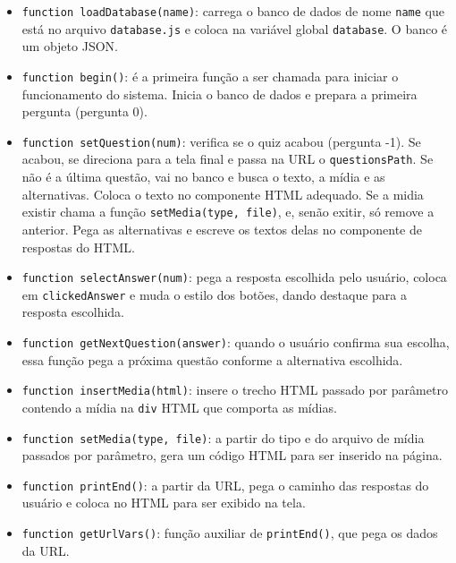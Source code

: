 \documentclass{article}
\begin{document}
\begin{itemize}

\item \texttt{function loadDatabase(name)}: carrega o banco de dados de nome \texttt{name} que está no arquivo \texttt{database.js} e coloca na variável global \texttt{database}. O banco é um objeto JSON.

\item \texttt{function begin()}: é a primeira função a ser chamada para iniciar o funcionamento do sistema. Inicia o banco de dados e prepara a primeira pergunta (pergunta 0).

\item \texttt{function setQuestion(num)}: verifica se o quiz acabou (pergunta -1). Se acabou, se direciona para a tela final e passa na URL o \texttt{questionsPath}. Se não é a última questão, vai no banco e busca o texto, a mídia e as alternativas. Coloca o texto no componente HTML adequado. Se a midia existir chama a função \texttt{setMedia(type, file)}, e, senão exitir, só remove a anterior. Pega as alternativas e escreve os textos delas no componente de respostas do HTML.

\item \texttt{function selectAnswer(num)}: pega a resposta escolhida pelo usuário, coloca em \texttt{clickedAnswer} e muda o estilo dos botões, dando destaque para a resposta escolhida.

\item \texttt{function getNextQuestion(answer)}: quando o usuário confirma sua escolha, essa função pega a próxima questão conforme a alternativa escolhida.

\item \texttt{function insertMedia(html)}: insere o trecho HTML passado por parâmetro contendo a mídia na \texttt{div} HTML que comporta as mídias.

\item \texttt{function setMedia(type, file)}: a partir do tipo e do arquivo de mídia passados por parâmetro, gera um código HTML para ser inserido na página.

\item \texttt{function printEnd()}: a partir da URL, pega o caminho das respostas do usuário e coloca no HTML para ser exibido na tela.

\item \texttt{function getUrlVars()}: função auxiliar de \texttt{printEnd()}, que pega os dados da URL.

\end{itemize}
\end{document}
